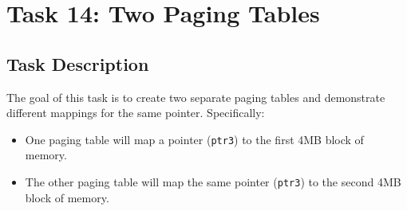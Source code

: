 \documentclass[a4paper,12pt]{report}
\begin{document}
\chapter{Task 14: Two Paging Tables}

\section{Task Description}
The goal of this task is to create two separate paging tables and demonstrate different mappings for the same pointer. Specifically:
\begin{itemize}
    \item One paging table will map a pointer (\texttt{ptr3}) to the first 4MB block of memory.
    \item The other paging table will map the same pointer (\texttt{ptr3}) to the second 4MB block of memory.
\end{itemize}
\end{document}
